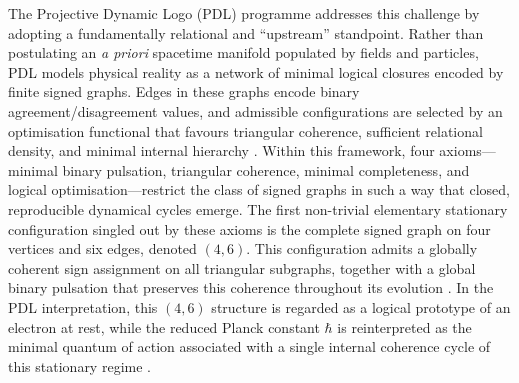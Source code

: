 \documentclass[11pt,a4paper]{article}
\numberwithin{equation}{section}
\begin{document}
The Projective Dynamic Logo (PDL) programme addresses this challenge by adopting a fundamentally relational and ``upstream'' standpoint. Rather than postulating an \textit{a priori} spacetime manifold populated by fields and particles, PDL models physical reality as a network of minimal logical closures encoded by finite signed graphs. Edges in these graphs encode binary agreement/disagreement values, and admissible configurations are selected by an optimisation functional that favours triangular coherence, sufficient relational density, and minimal internal hierarchy \cite{LaubscherIntroPDL2026,LaubscherPDLFull2026,LaubscherLDP2026,LaubscherIMRadPDL2026}. Within this framework, four axioms---minimal binary pulsation, triangular coherence, minimal completeness, and logical optimisation---restrict the class of signed graphs in such a way that closed, reproducible dynamical cycles emerge. The first non-trivial elementary stationary configuration singled out by these axioms is the complete signed graph on four vertices and six edges, denoted $(4,6)$. This configuration admits a globally coherent sign assignment on all triangular subgraphs, together with a global binary pulsation that preserves this coherence throughout its evolution \cite{LaubscherPDLFull2026,LaubscherLDP2026}. In the PDL interpretation, this $(4,6)$ structure is regarded as a logical prototype of an electron at rest, while the reduced Planck constant $\hbar$ is reinterpreted as the minimal quantum of action associated with a single internal coherence cycle of this stationary regime \cite{LaubscherIntroPDL2026,LaubscherPDLFull2026,LaubscherLDP2026}.
\end{document}
